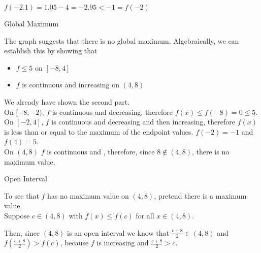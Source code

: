 \documentclass{ximera}
\begin{document}
\begin{exercise}
\begin{question}
\begin{warning}
$f(-2.1) = 1.05 - 4 = -2.95 < -1 = f(-2)$


\end{warning}


\end{question}





\begin{question} Global Maximum






The graph suggests that there is no global maximum. Algebraically, we can establish this by showing that 

\begin{itemize}
\item $f \leq 5$ on $[-8, 4]$ 
\item $f$ is continuous and increasing on $(4, 8)$
\end{itemize}

We already have shown the second part. \\



On $[-8, -2)$, $f$ is continuous and decreasing, therefore $f(x) \leq f(-8) = 0 \leq 5$.  \\


On $[-2, 4]$, $f$ is continuous and decreasing and then increasing, therefore $f(x)$ is less than or equal to the maximum of the endpoint values. $f(-2) = -1$ and $f(4) = 5$. \\


On $(4, 8)$ $f$ is continuous and  , therefore, since $8 \notin (4, 8)$, there is no maximum value.



\begin{idea} Open Interval

To see that $f$ has no maximum value on $(4, 8)$, pretend there is a maximum value. \\


Suppose $c \in (4, 8)$ with $f(x) \leq f(c)$ for all $x \in (4, 8)$.


Then, since $(4, 8)$ is an open interval we know that $\frac{c+8}{2} \in (4, 8)$ and $f\left( \frac{c+8}{2} \right) > f(c)$, because $f$ is increasing and $\frac{c+8}{2} > c$.







\end{idea}



\end{question}
\end{exercise}
\end{document}

